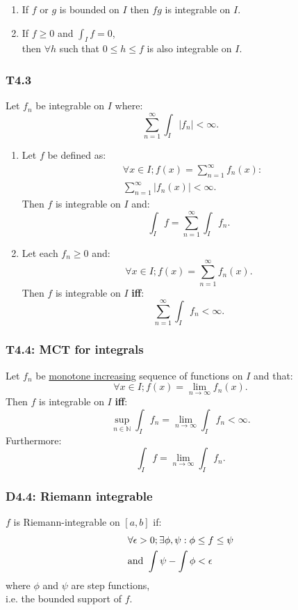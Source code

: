 \documentclass{article}
\begin{document}
\begin{multicols*}{3}
\begin{enumerate}
    \item If $f$ or $g$ is bounded on $I$
    then $fg$ is integrable on $I$.

    \item If $f\geq0$ and $\displaystyle\int_I f=0$, \\
    then $\forall h$ such that 
    $0\leq h\leq f$ is also integrable on $I$.
\end{enumerate}

\subsubsection*{T4.3}
Let $f_n$ be integrable on $I$ where:
$$\sum_{n=1}^{\infty}\int_I |f_n|<\infty.$$
\begin{enumerate}
    \item Let $f$ be defined as:
    \begin{align*}
        &\forall x\in I;f(x)=\sum_{n=1}^{\infty}f_n(x)
        : \\ &\sum_{n=1}^{\infty}|f_n(x)|<\infty.
    \end{align*}
    Then $f$ is integrable on $I$ and:
    $$\int_I f=\sum_{n=1}^{\infty}\int_I f_n.$$

    \item Let each $f_n\geq0$ and:
    $$\forall x\in I; f(x)=\sum_{n=1}^{\infty}f_n(x).$$
    Then $f$ is integrable on $I$ \textbf{if{}f}:
    $$\sum_{n=1}^{\infty}\int_I f_n<\infty.$$
\end{enumerate}

\subsubsection*{T4.4: MCT for integrals}
Let $f_n$ be \underline{monotone increasing}
sequence of functions on $I$ and that:
$$\forall x\in I;f(x)=\lim_{n\rightarrow\infty}f_n(x).$$
Then $f$ is integrable on $I$ \textbf{if{}f}:
$$\sup_{n\in\mathbb{N}}\int_I f_n
=\lim_{n\rightarrow\infty}\int_I f_n<\infty.$$
Furthermore:
$$\int_I f=\lim_{n\rightarrow\infty}\int_I f_n.$$

\subsubsection*{D4.4: Riemann integrable}
$f$ is Riemann-integrable on $[a,b]$ if:
\begin{align*}
    &\forall\epsilon>0; \exists\phi,
    \psi:\phi\leq f\leq\psi \\
    &\text{and}\hspace*{0.05in}
    \int\psi-\int\phi<\epsilon
\end{align*}
where $\phi$ and $\psi$ are step functions, \\
i.e. the bounded support of $f$.


\end{multicols*}
\end{document}
